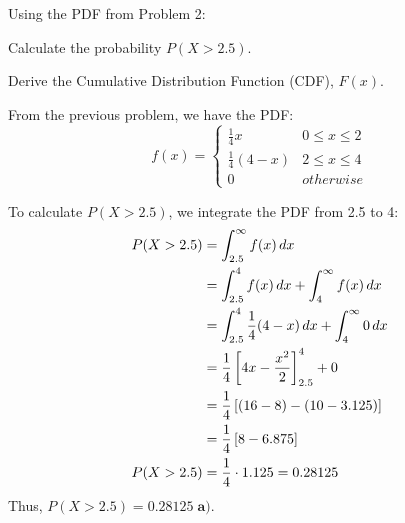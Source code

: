 \documentclass[a4paper, 10pt]{article}
\begin{document}
\newpage

\begin{problem}
Using the PDF from Problem 2:
\begin{subproblems}
    \item Calculate the probability \( P(X > 2.5) \).
    \item Derive the Cumulative Distribution Function (CDF), \( F(x) \).
\end{subproblems}
\end{problem}

\begin{solution}
From the previous problem, we have the PDF:
\[
f(x) = \begin{cases}
    \tfrac{1}{4}x & 0 \leq x \le 2 \\
    \tfrac{1}{4}(4 - x) & 2 \leq x \leq 4 \\
    0 & otherwise
\end{cases}
\]

To calculate \( P(X > 2.5) \), we integrate the PDF from 2.5 to 4:
\begin{align*}
    P(X > 2.5) &= \int_{2.5}^{\infty} f(x)\,dx \\
    &= \int_{2.5}^{4} f(x)\,dx + \int_{4}^{\infty} f(x)\,dx \\
    &= \int_{2.5}^{4} \frac{1}{4}(4 - x)\,dx + \int_{4}^{\infty} 0\,dx \\
    &= \frac{1}{4} \left[4x - \frac{x^2}{2}\right]_{2.5}^{4} + 0 \\
    &= \frac{1}{4} \left[(16 - 8) - (10 - 3.125)\right] \\
    &= \frac{1}{4} \left[8 - 6.875\right] \\
    P(X > 2.5) &= \frac{1}{4} \cdot 1.125 = 0.28125
\end{align*}
Thus, \( P(X > 2.5) = \boxed{0.28125} \; \textbf{a).} \)

\vspace{4mm}


\end{solution}
\end{document}
